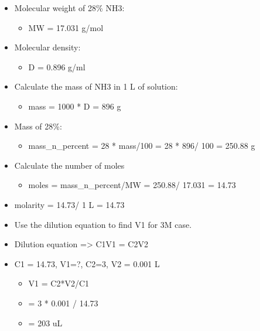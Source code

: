 \documentclass[sn-nature, twocolumn]{sn-jnl}%
\theoremstyle{thmstyleone}%
\theoremstyle{thmstyletwo}%
\theoremstyle{thmstylethree}%
\begin{document}
\begin{itemize}
    \item[] Molecular weight of 28\% NH3:
        \begin{itemize}
            \item[] MW = 17.031 g/mol
        \end{itemize}

    \item[] Molecular density:
        \begin{itemize}
            \item[] D = 0.896 g/ml
        \end{itemize}

    \item[] Calculate the mass of NH3 in 1 L of solution:
        \begin{itemize}
            \item[] mass = 1000 * D = 896 g
        \end{itemize}

    \item[] Mass of 28\%:

        \begin{itemize}
            \item[] mass\_n\_percent = 28 * mass/100 = 28 * 896/ 100 = 250.88 g
        \end{itemize}

    \item[] Calculate the number of moles

    \begin{itemize}
        \item[] moles = mass\_n\_percent/MW = 250.88/ 17.031 = 14.73
    \end{itemize}

    \item[]  molarity = 14.73/ 1 L = 14.73
 
    \item[] Use the dilution equation to find V1 for 3M case.
    \item[] Dilution equation => C1V1 = C2V2
 
     \item[]  C1 = 14.73, V1=?, C2=3, V2 = 0.001 L
            \begin{itemize}
                 \item[] V1 = C2*V2/C1
                 \item[] = 3 * 0.001 / 14.73
                 \item[] = 203 uL
            \end{itemize}
\end{itemize}
    
\end{document}
